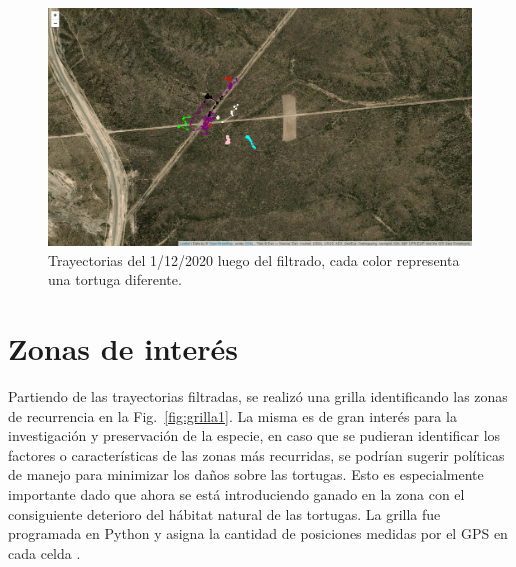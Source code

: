  
\begin{figure}[ht]
    \begin{center}
       
   
    \includegraphics[width=\imsize]{Chap2/Traye1_12_conF.png}
\end{center}
    \caption[Trayectorias un dia de medición, después del filtrado.]{Trayectorias del 1/12/2020 luego del filtrado, cada color representa una tortuga diferente.}
    \label{fig:trayeConFiltr}
\end{figure}
 
\section{Zonas de interés}
Partiendo de las trayectorias filtradas, se realizó  una grilla identificando las zonas de recurrencia en la Fig.~\ref{fig:grilla1}. La misma es de gran interés para la investigación y preservación de la especie, en caso que se pudieran identificar los factores o características de las zonas más recurridas, se podrían sugerir políticas de manejo para minimizar los daños sobre las tortugas. Esto es especialmente importante dado que ahora se está introduciendo ganado en la zona con el consiguiente deterioro del hábitat natural de las tortugas. La grilla fue programada en Python y asigna la cantidad de posiciones medidas por el GPS en cada celda \cite{github}.
 
